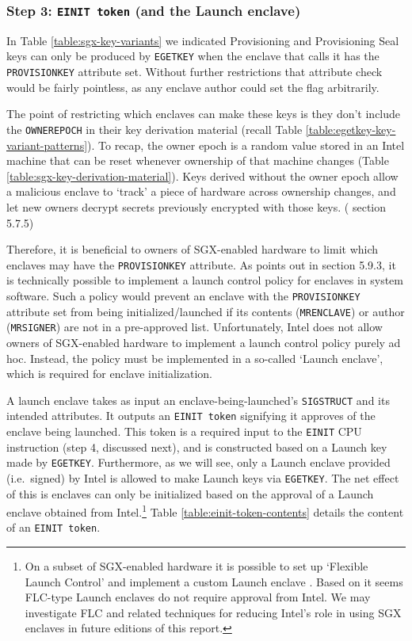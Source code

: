 \subsubsection{Step 3: {\tt EINIT token} (and the Launch enclave)}

In Table \ref{table:sgx-key-variants} we indicated Provisioning and Provisioning Seal keys can only be produced by {\tt EGETKEY} when the enclave that calls it has the {\tt PROVISIONKEY} attribute set. Without further restrictions that attribute check would be fairly pointless, as any enclave author could set the flag arbitrarily.

The point of restricting which enclaves can make these keys is they don't include the {\tt OWNEREPOCH} in their key derivation material (recall Table \ref{table:egetkey-key-variant-patterns}). To recap, the owner epoch is a random value stored in an Intel machine that can be reset whenever ownership of that machine changes (Table \ref{table:sgx-key-derivation-material}). Keys derived without the owner epoch allow a malicious enclave to `track' a piece of hardware across ownership changes, and let new owners decrypt secrets previously encrypted with those keys. (\cite{intel-sgx-explained-advanced} section 5.7.5)

Therefore, it is beneficial to owners of SGX-enabled hardware to limit which enclaves may have the {\tt PROVISIONKEY} attribute. As \cite{intel-sgx-explained-advanced} points out in section 5.9.3, it is technically possible to implement a launch control policy for enclaves in system software. Such a policy would prevent an enclave with the {\tt PROVISIONKEY} attribute set from being initialized/launched if its contents ({\tt MRENCLAVE}) or author ({\tt MRSIGNER}) are not in a pre-approved list. Unfortunately, Intel does not allow owners of SGX-enabled hardware to implement a launch control policy purely ad hoc. Instead, the policy must be implemented in a so-called `Launch enclave', which is required for enclave initialization.

A launch enclave takes as input an enclave-being-launched's {\tt SIGSTRUCT} and its intended attributes. It outputs an {\tt EINIT token} signifying it approves of the enclave being launched. This token is a required input to the {\tt EINIT} CPU instruction (step 4, discussed next), and is constructed based on a Launch key made by {\tt EGETKEY}. Furthermore, as we will see, only a Launch enclave provided (i.e.\ signed) by Intel is allowed to make Launch keys via {\tt EGETKEY}. The net effect of this is enclaves can only be initialized based on the approval of a Launch enclave obtained from Intel.\footnote{On a subset of SGX-enabled hardware it is possible to set up `Flexible Launch Control' \cite{sgx-flexible-launch-control-update} and implement a custom Launch enclave \cite{sgx-reference-launch-enclave}. Based on \cite{sgx-reference-launch-enclave} it seems FLC-type Launch enclaves do not require approval from Intel. We may investigate FLC and related techniques \cite{sgx-supporting-third-party-attestation} for reducing Intel's role in using SGX enclaves in future editions of this report.} Table \ref{table:einit-token-contents} details the content of an {\tt EINIT token}.

